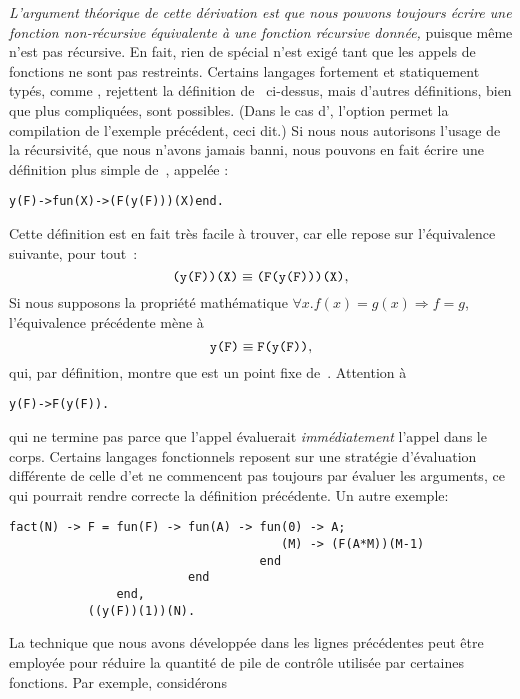 \emph{L'argument théorique de cette dérivation est que nous pouvons
  toujours écrire une fonction non-récursive équivalente à une
  fonction récursive donnée,} puisque même  n'est pas
récursive. En fait, rien de spécial n'est exigé tant que les appels de
fonctions ne sont pas restreints. Certains langages fortement et
statiquement typés, comme \OCaml, rejettent la définition
de~ ci-dessus, mais d'autres définitions, bien que plus
compliquées, sont possibles. (Dans le cas d'\OCaml, l'option
 permet la compilation de l'exemple précédent, ceci
dit.) Si nous nous autorisons l'usage de la récursivité, que nous
n'avons jamais banni, nous pouvons en fait écrire une définition plus
simple de~, appelée :
\begin{alltt}
y(F) -> fun(X) -> (F(y(F)))(X) end.\hfill% \emph{Récursive}
\end{alltt}
Cette définition est en fait très facile à trouver, car elle repose
sur l'équivalence suivante, pour tout~:
\begin{equation*}
\texttt{(y(F))(X)} \equiv \texttt{(F(y(F)))(X)},
\end{equation*}
Si nous supposons la propriété mathématique \(\forall x.f(x) = g(x)
\Rightarrow f = g\), l'équivalence précédente mène à
\begin{equation*}
\texttt{y(F)} \equiv \texttt{F(y(F))},
\end{equation*}
qui, par définition, montre que  est un point fixe
de~. Attention à
\begin{alltt}
y(F) -> F(y(F)).\hfill% \emph{Boucle infinie}
\end{alltt}
qui ne termine pas parce que l'appel  évaluerait
\emph{immédiatement} l'appel  dans le
corps. Certains langages fonctionnels reposent sur une stratégie
d'évaluation différente de celle d'\Erlang et ne commencent pas
toujours par évaluer les arguments, ce qui pourrait rendre correcte la
définition précédente. Un autre exemple:
\begin{verbatim}
fact(N) -> F = fun(F) -> fun(A) -> fun(0) -> A;
                                      (M) -> (F(A*M))(M-1)
                                   end
                         end
               end,
           ((y(F))(1))(N).
\end{verbatim}
La technique que nous avons développée dans les lignes précédentes
peut être employée pour réduire la quantité de pile de contrôle
utilisée par certaines fonctions. Par exemple, considérons
